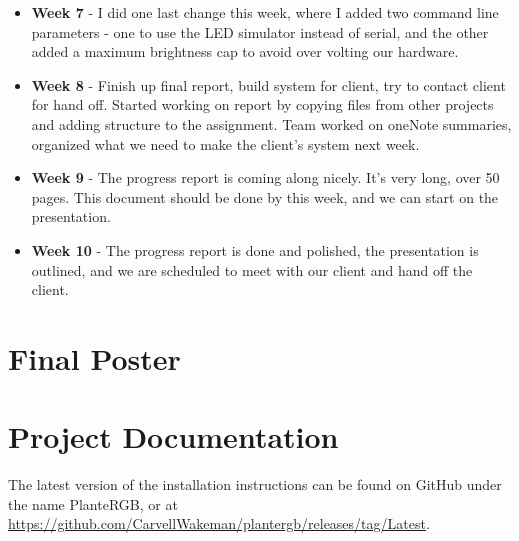 \documentclass[onecolumn, draftclsnofoot,10pt, compsoc]{IEEEtran}
\begin{document}
\begin{itemize}
					\item \textbf{Week 7} - I did one last change this week, where I added two command line parameters - one to use the LED simulator instead of serial, and the other added a maximum brightness cap to avoid over volting our hardware.
					\item \textbf{Week 8} - Finish up final report, build system for client, try to contact client for hand off. Started working on report by copying files from other projects and adding structure to the assignment. Team worked on oneNote summaries, organized what we need to make the client's system next week.
					\item \textbf{Week 9} - The progress report is coming along nicely. It's very long, over 50 pages. This document should be done by this week, and we can start on the presentation.
					\item \textbf{Week 10} - The progress report is done and polished, the presentation is outlined, and we are scheduled to meet with our client and hand off the client.
				\end{itemize}

	\section{Final Poster}


	\section{Project Documentation}
	The latest version of the installation instructions can be found on GitHub under the name PlanteRGB, or at \url{https://github.com/CarvellWakeman/plantergb/releases/tag/Latest}.
\end{document}
